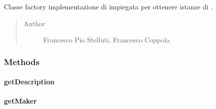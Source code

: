 \documentclass[letterpaper,10pt,italian,openany,oneside]{sphinxmanual}
\begin{document}
\begin{fulllineitems}
\label{\detokenize{source/it/unicam/cs/pa/mastermind/factories/InteractiveMakerFactory:it.unicam.cs.pa.mastermind.factories.InteractiveMakerFactory}}
Classe factory implementazione di  impiegata per ottenere istanze di .
\begin{quote}\begin{description}
\item[{Author}] \leavevmode
Francesco Pio Stelluti, Francesco Coppola

\end{description}\end{quote}

\end{fulllineitems}



\subsubsection{Methods}
\label{\detokenize{source/it/unicam/cs/pa/mastermind/factories/InteractiveMakerFactory:methods}}

\paragraph{getDescription}
\label{\detokenize{source/it/unicam/cs/pa/mastermind/factories/InteractiveMakerFactory:getdescription}}

\begin{fulllineitems}
\label{\detokenize{source/it/unicam/cs/pa/mastermind/factories/InteractiveMakerFactory:it.unicam.cs.pa.mastermind.factories.InteractiveMakerFactory.getDescription()}}
\end{fulllineitems}



\paragraph{getMaker}
\label{\detokenize{source/it/unicam/cs/pa/mastermind/factories/InteractiveMakerFactory:getmaker}}
\end{document}
